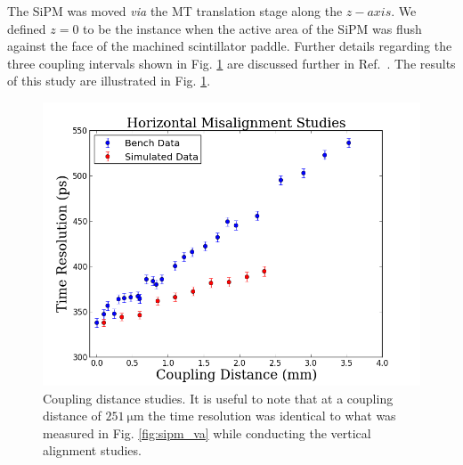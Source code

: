 The SiPM was moved \textit{via} the MT translation stage along the $z-axis$.  We defined $z = 0$ to be the instance when the active area of the SiPM was flush against the face of the machined scintillator paddle.  Further details regarding the three coupling intervals shown in Fig. \ref{fig:sipm_coupling} are discussed further in Ref.~\cite{pooser16}.  The results of this study are illustrated in Fig. \ref{fig:sipm_coupling}.
	\begin{figure}[!htb]
	\centering
	\includegraphics[width=1.0\columnwidth]{misalignment/figs/hori_ma}
	\caption{Coupling distance studies.  It is useful to note that at a coupling distance of $\mathrm{251\ \mu m}$ the time resolution was identical to what was measured in Fig. \ref{fig:sipm_va} while conducting the vertical alignment studies.}
	\label{fig:sipm_coupling}
	\end{figure}

